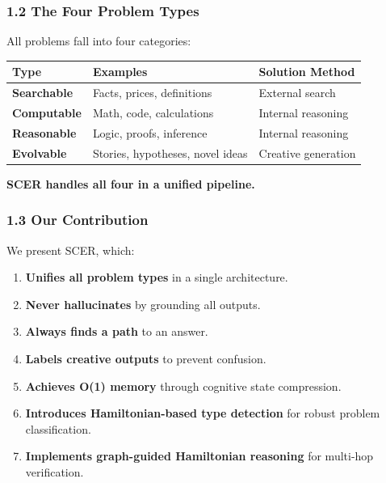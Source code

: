 \documentclass[
  11pt,
  a4paper,
]{article}
\providecommand{\tightlist}{%
  \setlength{\itemsep}{0pt}\setlength{\parskip}{0pt}}
\begin{document}
\subsubsection{1.2 The Four Problem Types}\label{the-four-problem-types}

All problems fall into four categories:

\begin{longtable}[]{@{}
  >{\raggedright\arraybackslash}p{}
  >{\raggedright\arraybackslash}p{}
  >{\raggedright\arraybackslash}p{}@{}}
\toprule\noalign{}
\begin{minipage}[b]{\linewidth}\raggedright
Type
\end{minipage} & \begin{minipage}[b]{\linewidth}\raggedright
Examples
\end{minipage} & \begin{minipage}[b]{\linewidth}\raggedright
Solution Method
\end{minipage} \\
\midrule\noalign{}
\endhead
\bottomrule\noalign{}
\endlastfoot
\textbf{Searchable} & Facts, prices, definitions & External search \\
\textbf{Computable} & Math, code, calculations & Internal reasoning \\
\textbf{Reasonable} & Logic, proofs, inference & Internal reasoning \\
\textbf{Evolvable} & Stories, hypotheses, novel ideas & Creative
generation \\
\end{longtable}

\textbf{SCER handles all four in a unified pipeline.}

\subsubsection{1.3 Our Contribution}\label{our-contribution}

We present SCER, which:

\begin{enumerate}
\def\labelenumi{\arabic{enumi}.}
\tightlist
\item
  \textbf{Unifies all problem types} in a single architecture.
\item
  \textbf{Never hallucinates} by grounding all outputs.
\item
  \textbf{Always finds a path} to an answer.
\item
  \textbf{Labels creative outputs} to prevent confusion.
\item
  \textbf{Achieves O(1) memory} through cognitive state compression.
\item
  \textbf{Introduces Hamiltonian-based type detection} for robust
  problem classification.
\item
  \textbf{Implements graph-guided Hamiltonian reasoning} for multi-hop
  verification.
\end{enumerate}
\end{document}
